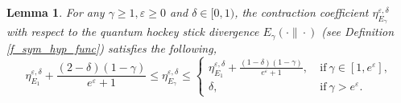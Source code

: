 \documentclass[onecolumn,ldraftcls, 11pt]{IEEEtran}
\newcommand{\eps}{\varepsilon}
\newtheorem{lemma}{Lemma}
\begin{document}
\begin{lemma}\label{lemma_contrac_hockey_stick}
    For any $\gamma \geq 1, \eps\geq 0$ and $\delta \in [0,1)$, the contraction coefficient $\eta_{E_{\gamma}}^{\eps,\delta}$ with respect to the quantum hockey stick divergence $E_{\gamma} (\cdot\|\cdot)$ (see Definition \ref{f_sym_hyp_func}) satisfies the following,
    \begin{equation}
        \eta^{\eps,\delta}_{E_1} + \frac{(2-\delta)(1-\gamma)}{e^\eps+1} \leq \eta_{E_{\gamma}}^{\eps,\delta} \leq \begin{cases}
            \eta^{\eps,\delta}_{E_1} + \frac{(1-\delta)(1-\gamma)}{e^\eps+1}, & ~\mbox{if}~ \gamma \in [1,e^\eps],\\
            \delta, & ~\mbox{if}~ \gamma > e^\eps.
        \end{cases} \label{lemma_contrac_hockey_stick_eq}
    \end{equation}
\end{lemma}
\end{document}
